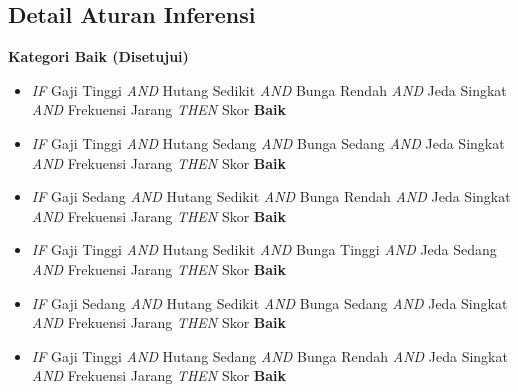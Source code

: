 \documentclass[12pt,a4paper]{report}
\begin{document}
\subsection{Detail Aturan Inferensi}

\noindent\textbf{Kategori Baik (Disetujui)}
\begin{itemize}
  \item[R01] \textit{IF} Gaji Tinggi \textit{AND} Hutang Sedikit \textit{AND} Bunga Rendah \textit{AND} Jeda Singkat \textit{AND} Frekuensi Jarang \textit{THEN} Skor \textbf{Baik}
  \item[R02] \textit{IF} Gaji Tinggi \textit{AND} Hutang Sedang \textit{AND} Bunga Sedang \textit{AND} Jeda Singkat \textit{AND} Frekuensi Jarang \textit{THEN} Skor \textbf{Baik}
  \item[R03] \textit{IF} Gaji Sedang \textit{AND} Hutang Sedikit \textit{AND} Bunga Rendah \textit{AND} Jeda Singkat \textit{AND} Frekuensi Jarang \textit{THEN} Skor \textbf{Baik}
  \item[R04] \textit{IF} Gaji Tinggi \textit{AND} Hutang Sedikit \textit{AND} Bunga Tinggi \textit{AND} Jeda Sedang \textit{AND} Frekuensi Jarang \textit{THEN} Skor \textbf{Baik}
  \item[R16] \textit{IF} Gaji Sedang \textit{AND} Hutang Sedikit \textit{AND} Bunga Sedang \textit{AND} Jeda Singkat \textit{AND} Frekuensi Jarang \textit{THEN} Skor \textbf{Baik}
  \item[R17] \textit{IF} Gaji Tinggi \textit{AND} Hutang Sedang \textit{AND} Bunga Rendah \textit{AND} Jeda Singkat \textit{AND} Frekuensi Jarang \textit{THEN} Skor \textbf{Baik}
\end{itemize}
\end{document}
